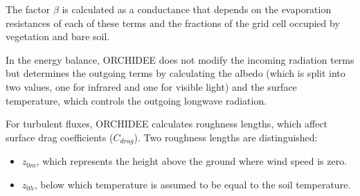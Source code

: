 The factor $\beta$ is calculated as a conductance that depends on the evaporation resistances of each of these terms and the fractions of the grid cell occupied by vegetation and bare soil.  





In the energy balance, ORCHIDEE does not modify the incoming radiation terms but determines the outgoing terms by calculating the albedo (which is split into two values, one for infrared and one for visible light) and the surface temperature, which controls the outgoing longwave radiation. 

For turbulent fluxes, ORCHIDEE calculates roughness lengths, which affect surface drag coefficients ($C_{drag}$). Two roughness lengths are distinguished:  
\begin{itemize}
    \item $z_{0m}$, which represents the height above the ground where wind speed is zero.
    \item $z_{0h}$, below which temperature is assumed to be equal to the soil temperature. 
\end{itemize} 

